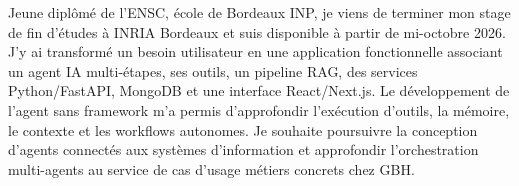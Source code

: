 
\begin{cvparagraph}
Jeune diplômé de l’ENSC, école de Bordeaux INP, je viens de terminer mon stage de fin d’études à INRIA Bordeaux et suis disponible à partir de mi-octobre 2026. J’y ai transformé un besoin utilisateur en une application fonctionnelle associant un agent IA multi-étapes, ses outils, un pipeline RAG, des services Python/FastAPI, MongoDB et une interface React/Next.js. Le développement de l’agent sans framework m’a permis d’approfondir l’exécution d’outils, la mémoire, le contexte et les workflows autonomes. Je souhaite poursuivre la conception d’agents connectés aux systèmes d’information et approfondir l’orchestration multi-agents au service de cas d’usage métiers concrets chez GBH.
\end{cvparagraph}
